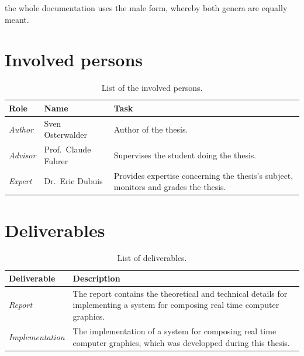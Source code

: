 \documentclass[%
    a4paper,    %
    justified,  %
    nobib,      %
    openany     %
]{tufte-book}
\begin{document}
 the whole documentation uses the male form, whereby both
genera are equally meant.

\section{Involved persons}
\label{sec:involved_persons}

\begin{table}[h]
  \caption{List of the involved persons.}
  \begin{tabularx}{\textwidth}{llX}
    \toprule
    \textbf{Role} & \textbf{Name} & \textbf{Task} \\
    \midrule
    \textit{Author}  & Sven Osterwalder\protect\footnotemark[1]{} & Author of the thesis.\\
    \textit{Advisor} & Prof.\ Claude Fuhrer\protect\footnotemark[2]{} & Supervises the student doing the thesis.\\
    \textit{Expert}  & Dr.\ Eric Dubuis\protect\footnotemark[3]{}     & Provides expertise concerning the thesis's subject, monitors and grades the thesis.\\
    \bottomrule
  \end{tabularx}
\end{table}

\newpage{}

\section{Deliverables}
\label{sec:deliverables}

\begin{table}[h]
  \caption{List of deliverables.}
  \begin{tabularx}{\textwidth}{lX}
    \toprule
    \textbf{Deliverable} & \textbf{Description} \\
    \midrule
    \textit{Report} & The report contains the theoretical and technical details for
    implementing a system for composing real time computer graphics. \\
    \midrule
    \textit{Implementation} & The implementation of a system for composing real time
    computer graphics, which was developped during this thesis. \\
    \bottomrule
  \end{tabularx}
\end{table}
\end{document}

